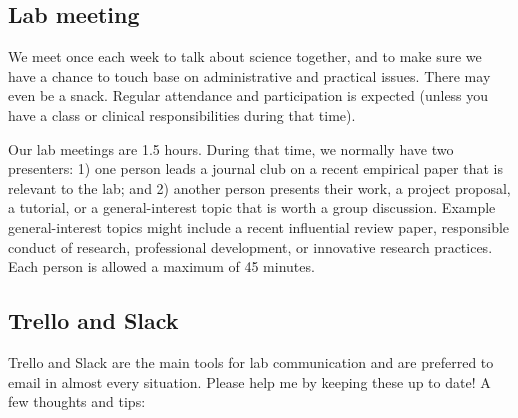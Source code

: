 \documentclass[letterpaper,12pt,oneside]{memoir}
\begin{document}
\subsection{Lab meeting}
We meet once each week to talk about science together, and to make sure we have a chance to touch base on administrative and practical issues. There may even be a snack. Regular attendance and participation is expected (unless you have a class or clinical responsibilities during that time).

Our lab meetings are 1.5 hours. During that time, we normally have two presenters: 1) one person leads a journal club on a recent empirical paper that is relevant to the lab; and 2) another person presents their work, a project proposal, a tutorial, or a general-interest topic that is worth a group discussion. Example general-interest topics might include a recent influential review paper, responsible conduct of research, professional development, or innovative research practices. Each person is allowed a maximum of 45 minutes. 


\subsection{Trello and Slack}
Trello and Slack are the main tools for lab communication and are preferred to email in almost every situation. Please help me by keeping these up to date! A few thoughts and tips:
\end{document}
